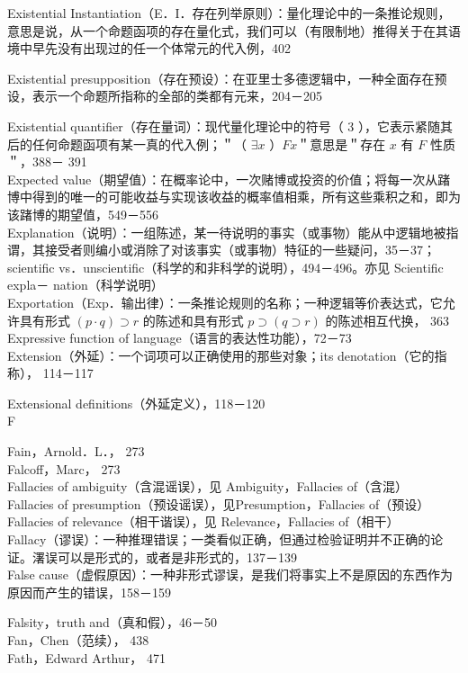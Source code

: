 Existential Instantiation（E．I．存在列举原则）：量化理论中的一条推论规则，意思是说，从一个命题函项的存在量化式，我们可以（有限制地）推得关于在其语境中早先没有出现过的任一个体常元的代入例，402

Existential presupposition（存在预设）：在亚里士多德逻辑中，一种全面存在预设，表示一个命题所指称的全部的类都有元来，204－205

Existential quantifier（存在量词）：现代量化理论中的符号（ 3 ），它表示紧随其后的任何命题函项有某一真的代入例；＂（ $\exists x$ ）$F x$＂意思是＂存在 $x$ 有 $F$ 性质＂，388－ 391\\
Expected value（期望值）：在概率论中，一次赌博或投资的价值；将每一次从踷博中得到的唯一的可能收益与实现该收益的概率值相乘，所有这些乘积之和，即为该踷博的期望值，549－556\\
Explanation（说明）：一组陈述，某一待说明的事实（或事物）能从中逻辑地被指谓，其接受者则编小或消除了对该事实（或事物）特征的一些疑问，35－37； scientific vs．unscientific（科学的和非科学的说明），494－496。亦见 Scientific expla－ nation（科学说明）\\
Exportation（Exp．输出律）：一条推论规则的名称；一种逻辑等价表达式，它允许具有形式 $(p \cdot q) \supset r$ 的陈述和具有形式 $p \supset(q \supset r)$ 的陈述相互代换， 363\\
Expressive function of language（语言的表达性功能），72－73\\
Extension（外延）：一个词项可以正确使用的那些对象；its denotation（它的指称）， 114－117

Extensional definitions（外延定义），118－120\\
F

Fain，Arnold．L．， 273\\
Falcoff，Marc， 273\\
Fallacies of ambiguity（含混谣误），见 Ambiguity，Fallacies of（含混）\\
Fallacies of presumption（预设谣误），见Presumption，Fallacies of（预设）\\
Fallacies of relevance（相干谐误），见 Relevance，Fallacies of（相干）\\
Fallacy（谬误）：一种推理错误；一类看似正确，但通过检验证明并不正确的论证。濖误可以是形式的，或者是非形式的，137－139\\
False cause（虚假原因）：一种非形式谬误，是我们将事实上不是原因的东西作为原因而产生的错误，158－159

Falsity，truth and（真和假），46－50\\
Fan，Chen（范续）， 438\\
Fath，Edward Arthur， 471

